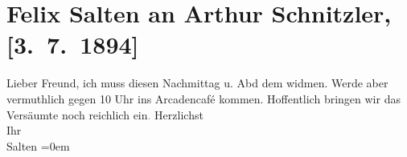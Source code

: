 

         
         \renewcommand{\erwaehntePersonen}{Personen: Felix Salten}
         \renewcommand{\erwaehnteOrte}{Orte: Café Arkaden, Wien}
         \renewcommand{\erwaehnteWerke}{}
               \section[Felix Salten an Arthur Schnitzler, {[}3. 7. 1894{]}]{ Felix Salten an Arthur Schnitzler, {[}3. 7. 1894{]}}\nopagebreak{}\rehead{ }\begin{ledgroupsized}[t]{13cm}\normalsize\beginnumbering \toendnotes[C]{\smallbreak\pagebreak[2]} 
\toendnotes[C]{\smallbreak}\pstart
           \noindent{}{\pb}Lieber Freund, ich muss diesen Nachmittag
               u. Abd dem \label{K_L03140-1v}\label{K_L03140-1h} widmen. Werde aber
               vermuthlich gegen 10 Uhr ins Arcadencafé kommen.\pend
           \pstart
           Hoffentlich bringen wir das Versäumte noch reichlich ein\textcolor{gray}{.}\pend
           \pstart
           Herzlichst {\\[\baselineskip]}Ihr {\\[\baselineskip]}\spacefill\mbox{Salten}\pend
           \leftskip=0em{}
         
         \endnumbering{}\end{ledgroupsized}  \newcommand{\dateiname}{L03140}\newcommand{\titel}{Felix Salten an Arthur Schnitzler, [3. 7. 1894]}\newcommand{\editorInnen}{Martin Anton Müller und Laura Untner}
      